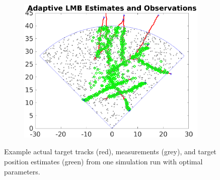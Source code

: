\documentclass{article}
\begin{document}
\begin{figure}[h]
\begin{subfigure}[t]{0.32\textwidth}
    \includegraphics[width=1\linewidth]{almb_tracks.png}
  \end{subfigure}
  \caption{Example actual target tracks (red), measurements (grey), and target position estimates (green) from one simulation run with optimal parameters.}
\end{figure}
\end{document}
